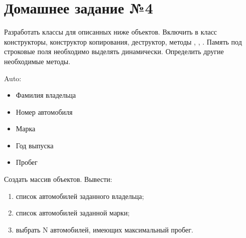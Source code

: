 \section*{Домашнее задание №4}

Разработать классы для описанных ниже объектов. Включить в класс
конструкторы, конструктор копирования, деструктор, методы ,
, . Память под строковые поля необходимо выделять
динамически. Определить другие необходимые методы.

Auto:
\begin{itemize}
	\item Фамилия владельца
	\item Номер автомобиля
	\item Марка
	\item Год выпуска
	\item Пробег
\end{itemize}

Создать массив объектов. Вывести:
\begin{enumerate}
	\item список автомобилей заданного владельца;
	\item список автомобилей заданной марки;
	\item выбрать N автомобилей, имеющих максимальный пробег.
\end{enumerate}
